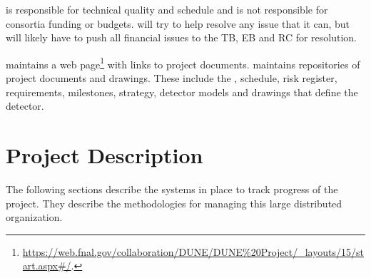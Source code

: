  is responsible for technical quality and schedule and is not
responsible for consortia funding or budgets.   will try to help
resolve any issue that it can, but will likely have to push all
financial issues to the TB, EB and RC for resolution.

 maintains a web
page\footnote{\url{https://web.fnal.gov/collaboration/DUNE/DUNE\%20Project/\_layouts/15/start.aspx\#/}.}
with links to project documents.  maintains repositories of
project documents and drawings. These include the ,
schedule, risk register, requirements, milestones, strategy, detector
models and drawings that define the  detector.

\section{ Project Description}

The following sections describe the systems in place to track progress
of the  project. They describe the methodologies for
managing this large distributed organization.

